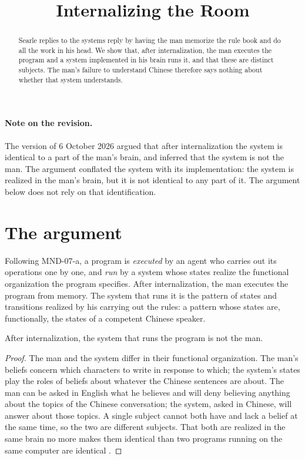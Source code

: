 \documentclass{situationist-preprint}
\title{Internalizing the Room}
\begin{document}
\maketitle

\begin{abstract}
Searle replies to the systems reply by having the man memorize the rule book and do all the work in his head. We show that, after internalization, the man executes the program and a system implemented in his brain runs it, and that these are distinct subjects. The man's failure to understand Chinese therefore says nothing about whether that system understands.
\end{abstract}

\paragraph{Note on the revision.} The version of 6 October 2026 argued that after internalization the system is identical to a part of the man's brain, and inferred that the system is not the man. The argument conflated the system with its implementation: the system is realized in the man's brain, but it is not identical to any part of it. The argument below does not rely on that identification.

\section{The argument}

Following MND-07-a, a program is \emph{executed} by an agent who carries out its operations one by one, and \emph{run} by a system whose states realize the functional organization the program specifies. After internalization, the man executes the program from memory. The system that runs it is the pattern of states and transitions realized by his carrying out the rules: a pattern whose states are, functionally, the states of a competent Chinese speaker.

\begin{proposition}\label{p:distinct}
After internalization, the system that runs the program is not the man.
\end{proposition}

\begin{proof}
The man and the system differ in their functional organization. The man's beliefs concern which characters to write in response to which; the system's states play the roles of beliefs about whatever the Chinese sentences are about. The man can be asked in English what he believes and will deny believing anything about the topics of the Chinese conversation; the system, asked in Chinese, will answer about those topics. A single subject cannot both have and lack a belief at the same time, so the two are different subjects. That both are realized in the same brain no more makes them identical than two programs running on the same computer are identical \citep{Cole1991}.
\end{proof}
\end{document}
